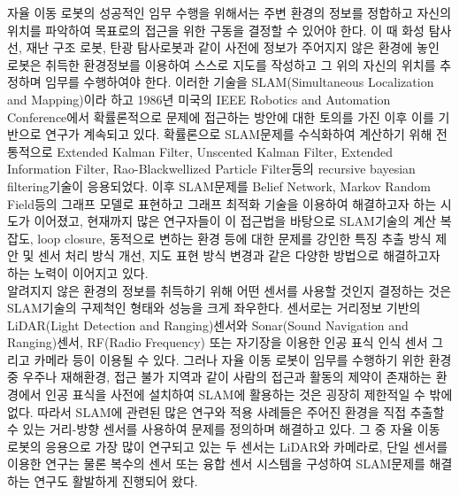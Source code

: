 \documentclass[master,korean,final]{cbnu-ecs}
\begin{document}
자율 이동 로봇의 성공적인 임무 수행을 위해서는 주변 환경의 정보를 정합하고 자신의 위치를 파악하여 목표로의 접근을 위한 구동을 결정할 수 있어야 한다. 이 때 화성 탐사선, 재난 구조 로봇, 탄광 탐사로봇과 같이 사전에 정보가 주어지지 않은 환경에 놓인 로봇은 취득한 환경정보를 이용하여 스스로 지도를 작성하고 그 위의 자신의 위치를 추정하며 임무를 수행하여야 한다. 이러한 기술을 SLAM(Simultaneous Localization and Mapping)이라 하고 1986년 미국의 IEEE Robotics and Automation Conference에서 확률론적으로 문제에 접근하는 방안에 대한 토의를 가진 이후 이를 기반으로 연구가 계속되고 있다\cite{Durrant2006}. 확률론으로 SLAM문제를 수식화하여 계산하기 위해 전통적으로 Extended Kalman Filter\cite{Dissanayake2000}, Unscented Kalman Filter\cite{Martinez2005}, Extended Information Filter\cite{Thrun2003}, Rao-Blackwellized Particle Filter\cite{Montemerlo2002}등의 recursive bayesian filtering기술이 응용되었다. 이후 SLAM문제를 Belief Network, Markov Random Field등의 그래프 모델로 표현하고 그래프 최적화 기술을 이용하여 해결하고자 하는 시도가 이어졌고\cite{Kummerle2011}, 
현재까지 많은 연구자들이 이 접근법을 바탕으로 SLAM기술의 계산 복잡도, loop closure, 동적으로 변하는 환경 등에 대한 문제를 강인한 특징 추출 방식 제안 및 센서 처리 방식 개선, 지도 표현 방식 변경과 같은 다양한 방법으로 해결하고자 하는 노력이 이어지고 있다.\\
알려지지 않은 환경의 정보를 취득하기 위해 어떤 센서를 사용할 것인지 결정하는 것은 SLAM기술의 구제척인 형태와 성능을 크게 좌우한다. 센서로는 거리정보 기반의 LiDAR(Light Detection and Ranging)센서와 Sonar(Sound Navigation and Ranging)센서, RF(Radio Frequency) 또는 자기장을 이용한 인공 표식 인식 센서 그리고 카메라 등이 이용될 수 있다. 그러나 자율 이동 로봇이 임무를 수행하기 위한 환경 중 우주나 재해환경, 접근 불가 지역과 같이 사람의 접근과 활동의 제약이 존재하는 환경에서 인공 표식을 사전에 설치하여 SLAM에 활용하는 것은 굉장히 제한적일 수 밖에 없다. 따라서 SLAM에 관련된 많은 연구와 적용 사례들은 주어진 환경을 직접 추출할 수 있는 거리-방향 센서를 사용하여 문제를 정의하며 해결하고 있다. 그 중 자율 이동 로봇의 응용으로 가장 많이 연구되고 있는 두 센서는 LiDAR와 카메라로, 단일 센서를 이용한 연구는 물론 복수의 센서 또는 융합 센서 시스템을 구성하여 SLAM문제를 해결하는 연구도 활발하게 진행되어 왔다.\\
\end{document}
